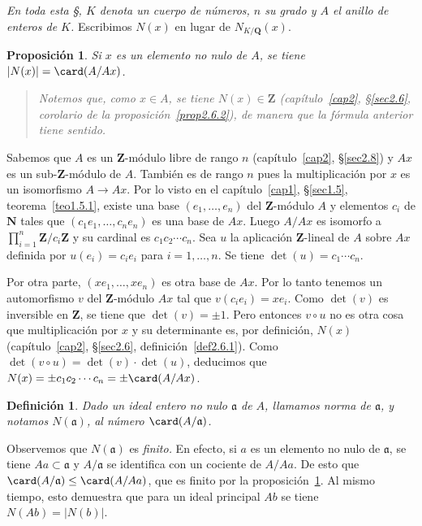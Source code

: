 \documentclass[bibtotoc,leqno,spanish]{amsbook}
\newcommand{\QQ}{\mathbf{Q}}
\newcommand{\ZZ}{\mathbf{Z}}
\newcommand{\NN}{\mathbf{N}}
\newcommand{\idl}[1]{\mathfrak{#1}}
\newcommand{\QED}{LQQD.}
\newcommand{\abs}[1]{\left\lvert#1\right\rvert}
\renewcommand{\to}[1][]{\xrightarrow{#1}}
\numberwithin{equation}{section}
\newenvironment{comm}%
	{\begin{quotation}\itshape}
	{\end{quotation}}
\theoremstyle{note}
\newtheorem{definition}{Definici\'on}
\theoremstyle{note}
\newtheorem{proposition}{Proposici\'on}
\theoremstyle{rem}
\numberwithin{theorem}{section}
\numberwithin{proposition}{section}
\numberwithin{definition}{section}
\numberwithin{lemma}{section}
\numberwithin{corollary}{section}
\numberwithin{example}{section}
\numberwithin{footnote}{section}%
\begin{document}
\begin{trivlist}\item
{\itshape En toda esta \S, $K$ denota un cuerpo de n\'umeros, $n$ su grado y $A$ el anillo
de enteros de $K$.} Escribimos $N(x)$ en lugar de $N_{K/\QQ}(x)$.
\end{trivlist}

\begin{proposition}\label{prop3.5.1}
Si $x$ es un elemento no nulo de $A$, se tiene $\abs{N(x)} = \card(A/Ax)$.
\end{proposition}

\begin{comm}
Notemos que, como $x\in A$, se tiene $N(x)\in\ZZ$ (cap\'itulo~\ref{cap2}, \S\ref{sec2.6}, corolario de la
proposici\'on~\ref{prop2.6.2}), de manera que
la f\'ormula anterior tiene sentido.
\end{comm}

Sabemos que $A$ es un $\ZZ$-m\'odulo libre de rango $n$ (cap\'itulo~\ref{cap2}, \S\ref{sec2.8}) y $Ax$ es un
sub-$\ZZ$-m\'odulo de $A$. Tambi\'en es de rango $n$ pues la multiplicaci\'on por $x$
es un isomorfismo $A\to Ax$. Por lo visto en el cap\'itulo~\ref{cap1}, \S\ref{sec1.5}, teorema~\ref{teo1.5.1}, existe una base
$(e_{1},\dots,e_{n})$ del $\ZZ$-m\'odulo $A$ y elementos $c_{i}$ de $\NN$ tales que
$(c_{1}e_{1},\dots,c_{n}e_{n})$ es una base de $Ax$. Luego $A/Ax$ es isomorfo a
$\prod_{i=1}^{n}\ZZ/c_{i}\ZZ$ y su cardinal es $c_{1}c_{2}\cdots c_{n}$. Sea $u$ la
aplicaci\'on $\ZZ$-lineal de $A$ sobre $Ax$ definida por $u(e_{i}) = c_{i}e_{i}$ para
$i=1,\dots,n$. Se tiene $\det(u) = c_{1}\cdots c_{n}$.

Por otra parte, $(xe_{1},\dots,xe_{n})$ es otra base de $Ax$. Por lo tanto tenemos un automorfismo
$v$ del $\ZZ$-m\'odulo $Ax$ tal que $v(c_{i}e_{i}) = xe_{i}$. Como $\det(v)$ es inversible en $\ZZ$,
se tiene que $\det(v)=\pm 1$. Pero entonces $v\circ u$ no es otra cosa que multiplicaci\'on por $x$
y su determinante es, por definici\'on, $N(x)$ (cap\'itulo~\ref{cap2}, \S\ref{sec2.6},
definici\'on~\ref{def2.6.1}). Como $\det(v\circ u)=
\det(v)\cdot\det(u)$, deducimos que $N(x) = \pm c_{1}c_{2}\cdots c_{n}=\pm \card(A/Ax)$.%

\begin{definition}\label{def3.5.1}
Dado un ideal entero no nulo $\idl{a}$ de $A$, llamamos norma de $\idl{a}$, y notamos $N(\idl{a})$,
al n\'umero $\card(A/\idl{a})$.
\end{definition}

Observemos que $N(\idl{a})$ es {\em finito.} En efecto, si $a$ es un elemento no nulo de $\idl{a}$,
se tiene $Aa\subset\idl{a}$ y $A/\idl{a}$ se identifica con un cociente de $A/Aa$. De esto que
$\card(A/\idl{a})\leq\card(A/Aa)$, que es finito por la proposici\'on~\ref{prop3.5.1}. Al mismo tiempo, esto demuestra que
para un ideal principal $Ab$ se tiene $N(Ab) = \abs{N(b)}$.
\end{document}
